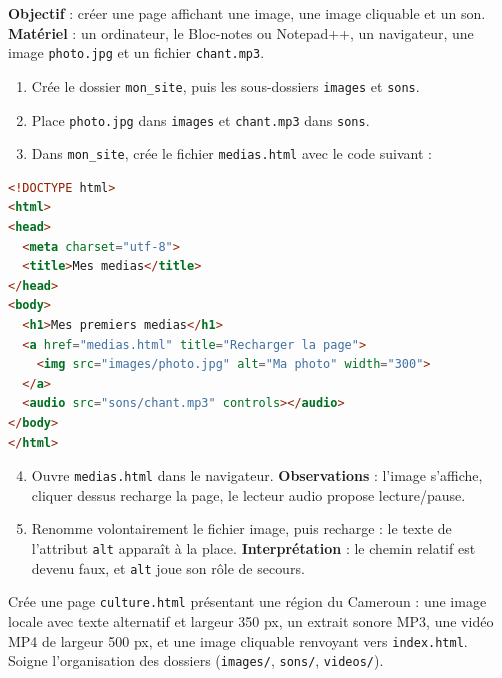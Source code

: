 \documentclass[11pt]{article}
\begin{document}
\begin{experience}
\textbf{Objectif} : créer une page affichant une image, une image cliquable et un son. \textbf{Matériel} : un ordinateur, le Bloc-notes ou Notepad++, un navigateur, une image \texttt{photo.jpg} et un fichier \texttt{chant.mp3}.
\begin{enumerate}
  \item Crée le dossier \texttt{mon\_site}, puis les sous-dossiers \texttt{images} et \texttt{sons}.
  \item Place \texttt{photo.jpg} dans \texttt{images} et \texttt{chant.mp3} dans \texttt{sons}.
  \item Dans \texttt{mon\_site}, crée le fichier \texttt{medias.html} avec le code suivant :
\end{enumerate}
\begin{lstlisting}[language=HTML]
<!DOCTYPE html>
<html>
<head>
  <meta charset="utf-8">
  <title>Mes medias</title>
</head>
<body>
  <h1>Mes premiers medias</h1>
  <a href="medias.html" title="Recharger la page">
    <img src="images/photo.jpg" alt="Ma photo" width="300">
  </a>
  <audio src="sons/chant.mp3" controls></audio>
</body>
</html>
\end{lstlisting}
\begin{enumerate}
  \setcounter{enumi}{3}
  \item Ouvre \texttt{medias.html} dans le navigateur. \textbf{Observations} : l'image s'affiche, cliquer dessus recharge la page, le lecteur audio propose lecture/pause.
  \item Renomme volontairement le fichier image, puis recharge : le texte de l'attribut \texttt{alt} apparaît à la place. \textbf{Interprétation} : le chemin relatif est devenu faux, et \texttt{alt} joue son rôle de secours.
\end{enumerate}
\end{experience}

\begin{exercice}
Crée une page \texttt{culture.html} présentant une région du Cameroun : une image locale avec texte alternatif et largeur 350 px, un extrait sonore MP3, une vidéo MP4 de largeur 500 px, et une image cliquable renvoyant vers \texttt{index.html}. Soigne l'organisation des dossiers (\texttt{images/}, \texttt{sons/}, \texttt{videos/}).
\end{exercice}
\end{document}

